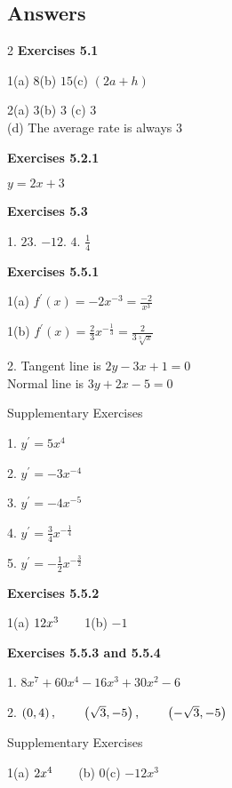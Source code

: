 \subsection{Answers}
\columnsep =30pt
\begin {multicols}{2}
 \textbf{Exercises 5.1} 

1(a) $8$\qquad (b) $15$\qquad (c) $(2 a +h)$ 

2(a) $3$\qquad (b) $3$ \qquad (c) $3$ \\\relax (d) The average rate is always $3$ 

\textbf{Exercises 5.2.1} 

$y =2 x +3$ 

\textbf{Exercises 5.3} 

1. $23$. $ -12$. $4$. $\frac{1}{4}$ 

\textbf{Exercises 5.5.1} 

1(a) $f^{ \prime } (x) = -2 x^{ -3} =\frac{ -2}{x^{3}}$ 

1(b) $f^{ \prime } \left (x\right ) =\frac{2}{3} x^{ -\frac{1}{3}} =\frac{2}{3 \sqrt[{3}]{x}}$ 

2. Tangent line is $2 y -3 x +1 =0$ \\\relax Normal line is $3 y +2 x -5 =0$ 

Supplementary Exercises 

1. $y^{ \prime } =5 x^{4}$ 

2. $y^{ \prime } = -3 x^{ -4}$ 

3. $y^{ \prime } = -4 x^{ -5}$ 

4. $y^{ \prime } =\frac{3}{4} x^{ -\frac{1}{4}}$ 

5. $y^{ \prime } = -\frac{1}{2} x^{ -\frac{3}{2}}$ 

\textbf{Exercises 5.5.2} 

1(a) $12 x^{3}\text{\quad \quad }$1(b) $ -1$ 

\textbf{Exercises 5.5.3 and 5.5.4} 

1. $8 x^{7} +60 x^{4} -16 x^{3} +30 x^{2} -6$ 

2. $\left (0 ,4\right ) ,\text{\quad \quad }\left (\sqrt{3} , -5\right ) ,\text{\quad \quad }\left ( -\sqrt{3} , -5\right )$ 

Supplementary Exercises 

1(a) $2 x^{4}\text{\quad \quad }$(b) $0$\qquad (c) $ -12 x^{3}$ 


\end{multicols}
